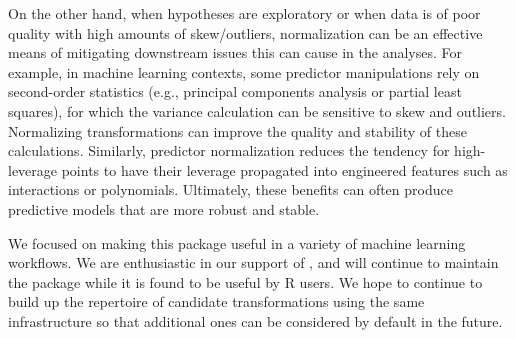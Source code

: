 On the other hand, when hypotheses are exploratory or when data is of
poor quality with high amounts of skew/outliers, normalization can be an
effective means of mitigating downstream issues this can cause in the
analyses. For example, in machine learning contexts, some predictor
manipulations rely on second-order statistics (e.g., principal
components analysis or partial least squares), for which the variance
calculation can be sensitive to skew and outliers. Normalizing
transformations can improve the quality and stability of these
calculations. Similarly, predictor normalization reduces the tendency
for high-leverage points to have their leverage propagated into
engineered features such as interactions or polynomials. Ultimately,
these benefits can often produce predictive models that are more robust
and stable.

We focused on making this package useful in a variety of machine
learning workflows. We are enthusiastic in our support of
, and will continue to maintain the package while it
is found to be useful by R users. We hope to continue to build up the
repertoire of candidate transformations using the same infrastructure so
that additional ones can be considered by default in the future.



\address{%
Ryan A. Peterson\\
Department of Biostatistics and Informatics\\%
University of Colorado Anschutz Medical Campus 13001 East 17th Place
Aurora, Colorado 80045 ORCID: 0000-0002-4650-5798\\
%
\url{https://petersonr.github.io/}\\%
%
%
}
